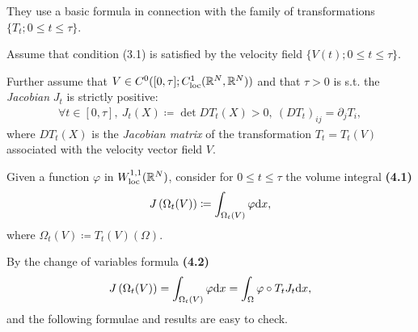 \documentclass[oneside]{book}
\numberwithin{equation}{section}
\begin{document}
They use a basic formula in connection with the family of transformations $\{T_t;0\le t\le\tau\}$.

Assume that condition (3.1) is satisfied by the velocity field $\{V(t);0\le t\le\tau\}$.

Further assume that $V\in C^0([0,\tau];C_{\rm loc}^1(\mathbb{R}^N,\mathbb{R}^N))$ and that $\tau > 0$ is s.t. the \textit{Jacobian} $J_t$ is strictly positive:
\begin{align*}
    \forall t\in[0,\tau],\ J_t(X)\coloneqq\det DT_t(X) > 0,\ (DT_t)_{ij} = \partial_jT_i, 
\end{align*}
where $DT_t(X)$ is the \textit{Jacobian matrix} of the transformation $T_t = T_t(V)$ associated with the velocity vector field $V$.

Given a function $\varphi$ in $W_{\rm loc}^{1,1}(\mathbb{R}^N)$, consider for $0\le t\le\tau$ the volume integral \textbf{(4.1)}
\begin{align*}
    J\left(\Omega_t(V)\right)\coloneqq\int_{\Omega_t(V)} \varphi{\rm d}x,
\end{align*}
where $\Omega_t(V)\coloneqq T_t(V)(\Omega)$.

By the change of variables formula \textbf{(4.2)}
\begin{align*}
    J\left(\Omega_t(V)\right) = \int_{\Omega_t(V)} \varphi{\rm d}x = \int_\Omega \varphi\circ T_tJ_t{\rm d}x,
\end{align*}
and the following formulae and results are easy to check.
\end{document}
